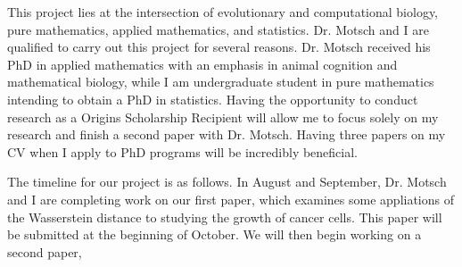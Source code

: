 \documentclass[8 pt]{article}
\begin{document}
This project lies at the intersection of evolutionary and computational biology, pure mathematics, applied mathematics, and statistics. Dr. Motsch and I are qualified to carry out this project for several reasons. Dr. Motsch received his PhD in applied mathematics with an emphasis in animal cognition and mathematical biology, while I am undergraduate student in pure mathematics intending to obtain a PhD in statistics. Having the opportunity to conduct research as a Origins Scholarship Recipient will allow me to focus solely on my research and finish a second paper with Dr. Motsch. Having three papers on my CV when I apply to PhD programs will be incredibly beneficial. 

The timeline for our project is as follows. In August and September, Dr. Motsch and I are completing work on our first paper, which examines some appliations of the Wasserstein distance to studying the growth of cancer cells. This paper will be submitted at the beginning of October. We will then begin working on a second paper, 
\end{document}
